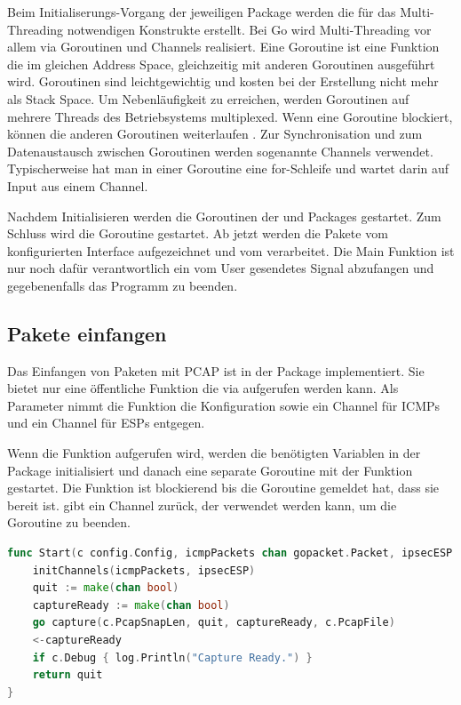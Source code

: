 Beim Initialiserungs-Vorgang der jeweiligen Package werden die für das Multi-Threading notwendigen Konstrukte erstellt. Bei Go wird Multi-Threading vor allem via Goroutinen und Channels realisiert. Eine Goroutine ist eine Funktion die im gleichen Address Space, gleichzeitig mit anderen Goroutinen ausgeführt wird. Goroutinen sind leichtgewichtig und kosten bei der Erstellung nicht mehr als Stack Space. Um Nebenläufigkeit zu erreichen, werden Goroutinen auf mehrere Threads des Betriebsystems multiplexed. Wenn eine Goroutine blockiert, können die anderen Goroutinen weiterlaufen \cite[:1391]{effective_go}.
Zur Synchronisation und zum Datenaustausch zwischen Goroutinen werden sogenannte Channels verwendet. Typischerweise hat man in einer Goroutine eine for-Schleife und wartet darin auf Input aus einem Channel.

Nachdem Initialisieren werden die Goroutinen der  und  Packages gestartet. Zum Schluss wird die  Goroutine gestartet. Ab jetzt werden die Pakete vom konfigurierten Interface aufgezeichnet und vom \tool{} verarbeitet. Die Main Funktion ist nur noch dafür verantwortlich ein vom User gesendetes  Signal abzufangen und gegebenenfalls das Programm zu beenden.

\subsection{Pakete einfangen}
Das Einfangen von Paketen mit \ac{PCAP} ist in der  Package implementiert. Sie bietet nur eine öffentliche Funktion die via  aufgerufen werden kann. Als Parameter nimmt die Funktion die Konfiguration sowie ein Channel für \ac{ICMP}s und ein Channel für \ac{ESP}s entgegen. 

Wenn die Funktion  aufgerufen wird, werden die benötigten Variablen in der  Package initialisiert und danach eine separate Goroutine mit der  Funktion gestartet. Die  Funktion ist blockierend bis die  Goroutine gemeldet hat, dass sie bereit ist.  gibt ein Channel zurück, der verwendet werden kann, um die \linebreak {} Goroutine zu beenden.

\begin{lstlisting}[language=go, caption=Öffentliche Funktion capture.Start()]     
func Start(c config.Config, icmpPackets chan gopacket.Packet, ipsecESP chan gopacket.Packet) chan bool {
	initChannels(icmpPackets, ipsecESP)
	quit := make(chan bool)
	captureReady := make(chan bool)
	go capture(c.PcapSnapLen, quit, captureReady, c.PcapFile)
	<-captureReady
	if c.Debug { log.Println("Capture Ready.") }
	return quit
}
\end{lstlisting}

